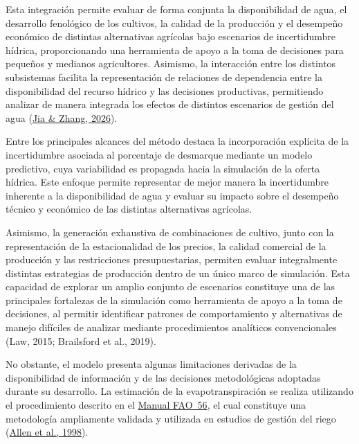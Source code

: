 \documentclass[12pt]{report}
\newcommand{\citeref}[2]{\hyperlink{ref:#1}{#2}}
\begin{document}
Esta integración permite evaluar de forma conjunta la disponibilidad de agua, el desarrollo fenológico de los cultivos, la calidad de la producción y el desempeño económico de distintas alternativas agrícolas bajo escenarios de incertidumbre hídrica, proporcionando una herramienta de apoyo a la toma de decisiones para pequeños y medianos agricultores. Asimismo, la interacción entre los distintos subsistemas facilita la representación de relaciones de dependencia entre la disponibilidad del recurso hídrico y las decisiones productivas, permitiendo analizar de manera integrada los efectos de distintos escenarios de gestión del agua (\citeref{jia2026}{Jia \& Zhang, 2026}).

Entre los principales alcances del método destaca la incorporación explícita de la incertidumbre asociada al porcentaje de desmarque mediante un modelo predictivo, cuya variabilidad es propagada hacia la simulación de la oferta hídrica. Este enfoque permite representar de mejor manera la incertidumbre inherente a la disponibilidad de agua y evaluar su impacto sobre el desempeño técnico y económico de las distintas alternativas agrícolas.

Asimismo, la generación exhaustiva de combinaciones de cultivo, junto con la representación de la estacionalidad de los precios, la calidad comercial de la producción y las restricciones presupuestarias, permiten evaluar integralmente distintas estrategias de producción dentro de un único marco de simulación. Esta capacidad de explorar un amplio conjunto de escenarios constituye una de las principales fortalezas de la simulación como herramienta de apoyo a la toma de decisiones, al permitir identificar patrones de comportamiento y alternativas de manejo difíciles de analizar mediante procedimientos analíticos convencionales (Law, 2015; Brailsford et al., 2019).

No obstante, el modelo presenta algunas limitaciones derivadas de la disponibilidad de información y de las decisiones metodológicas adoptadas durante su desarrollo. La estimación de la evapotranspiración se realiza utilizando el procedimiento descrito en el \citeref{allen1998}{Manual FAO~56}, el cual constituye una metodología ampliamente validada y utilizada en estudios de gestión del riego (\citeref{allen1998}{Allen et al., 1998}).
\end{document}
